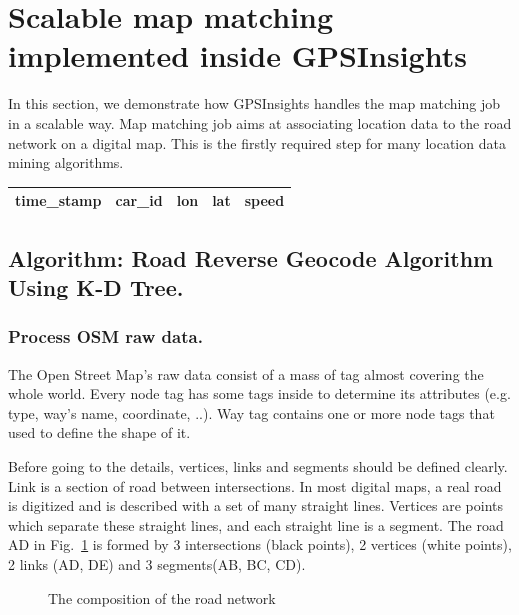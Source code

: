 \documentclass{acm_proc_article-sp}
\begin{document}
\section{Scalable map matching implemented inside GPSInsights}

In this section, we demonstrate how GPSInsights handles the map matching job in a scalable way. Map matching job aims at associating location data to the road network on a digital map. This is the firstly required step for many location data mining algorithms. 

\begin{table}[h]
\centering
\begin{tabular}{|c|c|c|c|c|}
\hline
\textbf{time\_stamp} & \textbf{car\_id} & \textbf{lon}   & \textbf{lat} & \textbf{speed} \\ \hline
\end{tabular}
\end{table}

\subsection{Algorithm: Road Reverse Geocode Algorithm Using K-D Tree.}	
	
\subsubsection{Process OSM raw data.} \label{ssec:links}
	The Open Street Map's raw data consist of a mass of tag almost covering the whole world. Every node tag has some tags inside to determine its attributes (e.g. type, way's name, coordinate, ..). Way tag contains one or more node tags that used to define the shape of it.
	
		\setlength{\parindent}{0.7cm} Before going to the details, vertices, links and segments should be defined clearly. Link is a section of road between intersections. In most digital maps, a real road is digitized and is described with a set of many straight lines. Vertices are points which separate these straight lines, and each straight line is a segment. The road AD in Fig.~\ref{fig:composition} is formed by 3 intersections (black points), 2 vertices (white points), 2 links (AD, DE) and 3 segments(AB, BC, CD).
		
\begin{figure}[h]
\centering
{}
\caption{The composition of the road network}
\label{fig:composition}
\end{figure}
	
\end{document}
